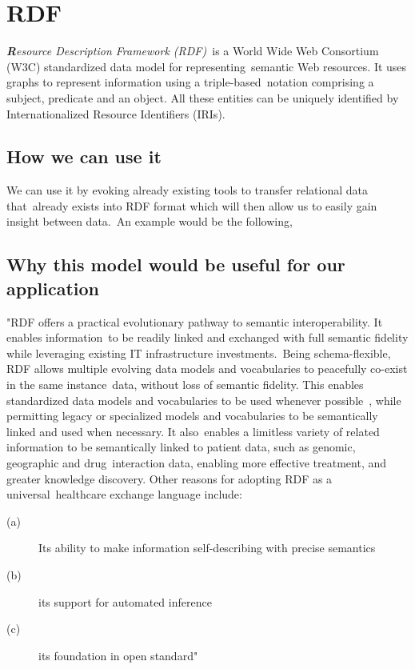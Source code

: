 \documentclass[DIV=calc, paper=a4, fontsize=12pt, onecolumn]{scrartcl}	 %
\newcommand{\initial}[1]{ %
\lettrine[lines=3,lhang=0.3,nindent=0em,slope=0em]{
\color{DarkBlue}
{\textbf{\textit{#1}}}}{}}
\begin{document}
 \section[Resource Description Framework (RDF)]{RDF}
  \label{sec:rdf}

\initial{R}\textit{esource Description Framework (RDF)}\
is a World Wide Web Consortium (W3C) standardized data model for representing\
semantic Web resources. It uses graphs to represent information using a triple-based\
 notation comprising a subject, predicate and an object. All these entities can be uniquely identified by Internationalized Resource Identifiers (IRIs).\
  \cite{pathak_applying_2012}

\subsection{How we can use it}

We can use it by evoking already existing tools to transfer relational data that\
already exists into RDF format which will then allow us to easily gain insight between data.\
An example would be the following,

\subsection{Why this model would be useful for our application}

"RDF offers a practical evolutionary pathway to semantic interoperability. It enables information\
 to be readily linked and exchanged with full semantic fidelity while leveraging existing IT infrastructure investments.\
 Being schema-flexible, RDF allows multiple evolving data models and vocabularies to peacefully co-exist in the same instance\
data, without loss of semantic fidelity. This enables standardized data models and vocabularies to be used whenever possible\
, while permitting legacy or specialized models and vocabularies to be semantically linked and used when necessary. It also\
 enables a limitless variety of related information to be semantically linked to patient data, such as genomic, geographic and drug\
 interaction data, enabling more effective treatment, and greater knowledge discovery. Other reasons for adopting RDF as a universal\
 healthcare exchange language include:

\begin{description}
\item[(a)]  Its ability to make information self-describing with precise semantics
\item[(b)] its support for automated inference
\item[(c)]  its foundation in open standard"
\end{description}
\end{document}
